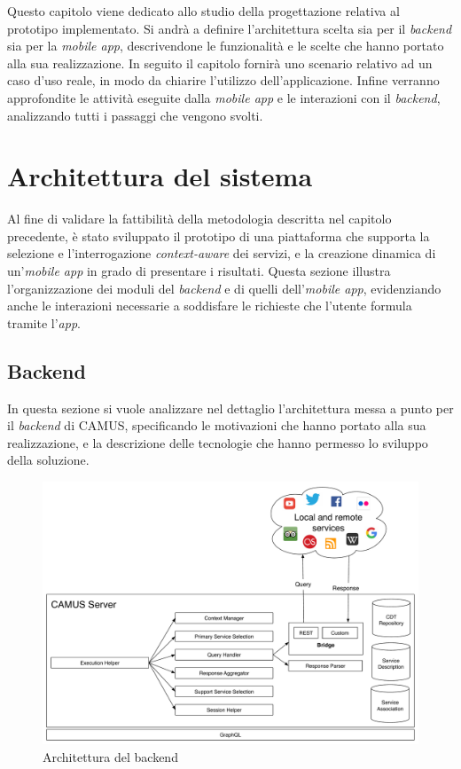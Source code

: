 Questo capitolo viene dedicato allo studio della progettazione relativa al prototipo implementato. Si andrà a definire l'architettura scelta sia per il \emph{backend} sia per la \emph{mobile app}, descrivendone le funzionalità e le scelte che hanno portato alla sua realizzazione. In seguito il capitolo fornirà uno scenario relativo ad un caso d'uso reale, in modo da chiarire l'utilizzo dell'applicazione. Infine verranno approfondite le attività eseguite dalla \emph{mobile app} e le interazioni con il \emph{backend}, analizzando tutti i passaggi che vengono svolti.

\section{Architettura del sistema\label{sec:architettura-sistema}}

Al fine di validare la fattibilità della metodologia descritta nel capitolo precedente, è stato sviluppato il prototipo di una piattaforma che supporta la selezione e l'interrogazione \emph{context-aware} dei servizi, e la creazione dinamica di un'\textit{mobile app} in grado di presentare i risultati. Questa sezione illustra l'organizzazione dei moduli del \emph{backend} e di quelli dell'\emph{mobile app}, evidenziando anche le interazioni necessarie a soddisfare le richieste che l'utente formula tramite l'\emph{app}.

\subsection{Backend\label{sec:architettura-backend}}

In questa sezione si vuole analizzare nel dettaglio l'architettura messa a punto per il \emph{backend} di CAMUS, specificando le motivazioni che hanno portato alla sua realizzazione, e la descrizione delle tecnologie che hanno permesso lo sviluppo della soluzione.

\begin{figure}[ht]
	\centering
	\includegraphics[width=\textwidth]{4-progettazione-alto-livello/Immagini/camus-architecture-backend.pdf}
	\caption{Architettura del backend}\label{fig:architettura-backend}
\end{figure}

